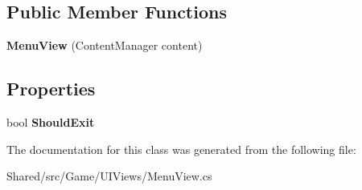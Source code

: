 \subsection*{Public Member Functions}
\begin{DoxyCompactItemize}
\item 
\hypertarget{class_midnight_blue_1_1_menu_view_a80f778b2634f4b660f7f5e0393271a06}{}\label{class_midnight_blue_1_1_menu_view_a80f778b2634f4b660f7f5e0393271a06} 
{\bfseries Menu\+View} (Content\+Manager content)
\end{DoxyCompactItemize}
\subsection*{Properties}
\begin{DoxyCompactItemize}
\item 
\hypertarget{class_midnight_blue_1_1_menu_view_a8d81609074b935a6af5d9ac4238a73ee}{}\label{class_midnight_blue_1_1_menu_view_a8d81609074b935a6af5d9ac4238a73ee} 
bool {\bfseries Should\+Exit}
\end{DoxyCompactItemize}


The documentation for this class was generated from the following file\+:\begin{DoxyCompactItemize}
\item 
Shared/src/\+Game/\+U\+I\+Views/Menu\+View.\+cs\end{DoxyCompactItemize}
